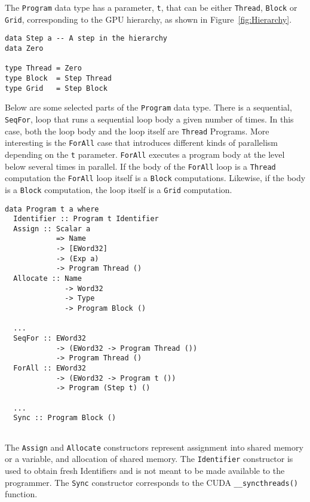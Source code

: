 The {\tt Program} data type has a parameter, {\tt t}, that can be 
either {\tt Thread}, {\tt Block} or {\tt Grid}, corresponding to 
the GPU hierarchy, as shown in Figure~\ref{fig:Hierarchy}.

\begin{small}
\begin{verbatim} 
data Step a -- A step in the hierarchy
data Zero
  
type Thread = Zero 
type Block  = Step Thread 
type Grid   = Step Block  
\end{verbatim} 
\end{small}


Below are some selected parts of the  {\tt Program} data type. There 
is a sequential, {\tt SeqFor}, loop that runs a sequential loop body a given 
number of times. In this case, both the loop body and the loop itself are 
{\tt Thread} Programs. More interesting is the {\tt ForAll} case that introduces 
 different kinds of parallelism depending on the {\tt t} parameter.
{\tt ForAll} executes a program body at the level below several times in parallel. 
If the body of the {\tt ForAll} loop is a {\tt Thread} computation the {\tt ForAll} loop 
itself is a {\tt Block} computations. Likewise, if the body is a {\tt Block} computation, 
the loop itself is a {\tt Grid} computation. 

\begin{small} 
\begin{Verbatim}[samepage=true]
data Program t a where 
  Identifier :: Program t Identifier 
  Assign :: Scalar a
            => Name 
            -> [EWord32]
            -> (Exp a)
            -> Program Thread ()
  Allocate :: Name 
              -> Word32 
              -> Type 
              -> Program Block ()

  ... 
  SeqFor :: EWord32 
            -> (EWord32 -> Program Thread ())
            -> Program Thread ()
  ForAll :: EWord32 
            -> (EWord32 -> Program t ())
            -> Program (Step t) ()
 
  ... 
  Sync :: Program Block () 
   
\end{Verbatim}
\end{small} 

The {\tt Assign} and {\tt Allocate} constructors represent assignment into 
shared memory or a variable, and allocation of shared memory. The {\tt Identifier} 
constructor is used to obtain fresh Identifiers and is not meant to be made available
to the programmer. The {\tt Sync} constructor corresponds to the 
CUDA {\tt \_\_syncthreads()} function. 

